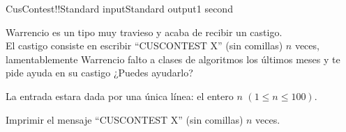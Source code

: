 \begin{problem}{CusContest!!}{Standard input}{Standard output}{1 second}


Warrencio es un tipo muy travieso y acaba de recibir un castigo.\\
El castigo consiste en escribir ``CUSCONTEST X'' (sin comillas) $n$ veces, lamentablemente Warrencio falto a clases de algoritmos los últimos meses y te pide ayuda en su castigo ¿Puedes ayudarlo?

\InputFile
La entrada estara dada por una única línea: el entero $n$ $(1\leq n \leq 100)$.

\OutputFile
Imprimir el mensaje ``CUSCONTEST X'' (sin comillas) $n$ veces.

\Example

\begin{example}
\end{example}

\end{problem}
